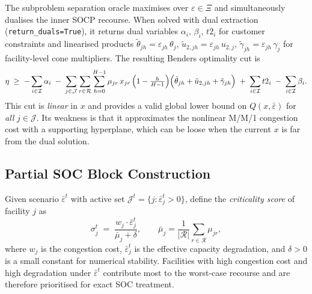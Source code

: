 The subproblem separation oracle maximises over $\varepsilon\in\Xi$
and simultaneously dualises the inner SOCP recourse.
When solved with dual extraction (\texttt{return\_duals=True}),
it returns dual variables
$\alpha_i,\,\beta_i,\,t2_i$ for customer constraints and
linearised products
$\tilde\theta_{jh} = \varepsilon_{jh}\,\theta_j$,
$\tilde u_{2,jh} = \varepsilon_{jh}\,u_{2,j}$,
$\tilde\gamma_{jh} = \varepsilon_{jh}\,\gamma_j$
for facility-level cone multipliers.
The resulting Benders optimality cut is
\begin{equation}
  \eta \;\ge\;
  -\sum_{i\in\mathcal{I}} \alpha_i
  \;-\; \sum_{j\in\mathcal{J}}\sum_{r\in\mathcal{R}}\sum_{h=0}^{H-1}
        \mu_{jr}\,x_{jr}\,\Bigl(1 - \tfrac{h}{H-1}\Bigr)
        \Bigl(\tilde\theta_{jh} + \tilde u_{2,jh} + \tilde\gamma_{jh}\Bigr)
  \;+\; \sum_{i\in\mathcal{I}} t2_i
  \;-\; \sum_{i\in\mathcal{I}} \beta_i.
  \label{eq:benders:cut}
\end{equation}
This cut is \emph{linear} in $x$ and provides a valid global lower
bound on $Q(x,\bar\varepsilon)$ for \emph{all} $j\in\mathcal{J}$.
Its weakness is that it approximates the nonlinear M/M/1 congestion
cost with a supporting hyperplane, which can be loose when the
current $x$ is far from the dual solution.

\subsection{Partial SOC Block Construction}
\label{sec:rpbd:partial}

Given scenario $\bar\varepsilon^t$ with active set
$\mathcal{J}^t = \{j : \bar\varepsilon^t_j > 0\}$,
define the \emph{criticality score} of facility $j$ as
\begin{equation}
  \sigma_j^t
  \;=\;
  \frac{w_j \cdot \bar\varepsilon^t_j}
       {\bar\mu_j + \delta},
  \qquad
  \bar\mu_j = \frac{1}{|\mathcal{R}|}\sum_{r\in\mathcal{R}} \mu_{jr},
  \label{eq:score}
\end{equation}
where $w_j$ is the congestion cost, $\bar\varepsilon^t_j$ is the
effective capacity degradation, and $\delta > 0$ is a small constant
for numerical stability.
Facilities with high congestion cost and high degradation under
$\bar\varepsilon^t$ contribute most to the worst-case recourse
and are therefore prioritised for exact SOC treatment.

